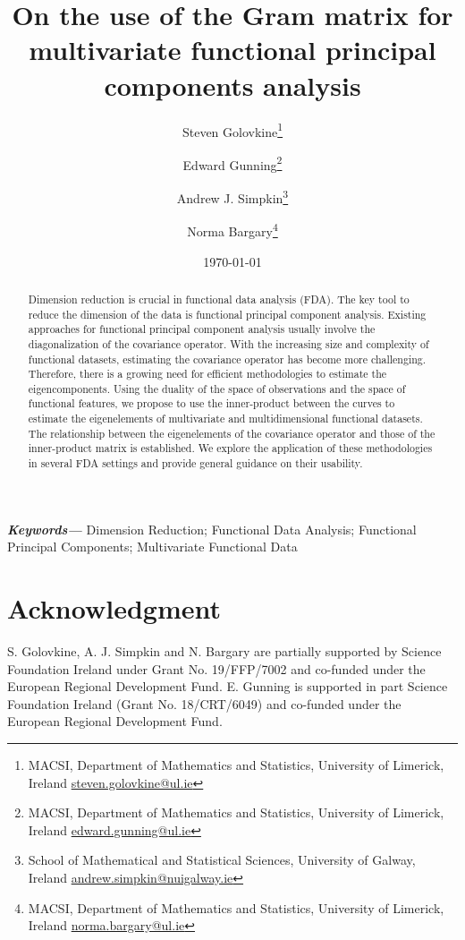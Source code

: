 \documentclass{article}
\title{On the use of the Gram matrix for multivariate functional principal components analysis}
\author{%
Steven Golovkine\thanks{MACSI, Department of Mathematics and Statistics, University of Limerick, Ireland \href{mailto:steven.golovkine@ul.ie}{steven.golovkine@ul.ie}}
\and
Edward Gunning\thanks{MACSI, Department of Mathematics and Statistics, University of Limerick, Ireland \href{mailto:edward.gunning@ul.ie}{edward.gunning@ul.ie}}
\and
Andrew J. Simpkin\thanks{School of Mathematical and Statistical Sciences, University of Galway, Ireland \href{mailto:andrew.simpkin@nuigalway.ie}{andrew.simpkin@nuigalway.ie}}
\and
Norma Bargary\thanks{MACSI, Department of Mathematics and Statistics, University of Limerick, Ireland \href{mailto:norma.bargary@ul.ie}{norma.bargary@ul.ie}}
}
\date{\today}
\newcounter{th}
\providecommand{\keywords}[1]{\textbf{\textit{Keywords---}} #1}
\begin{document}
\maketitle

\begin{abstract}
Dimension reduction is crucial in functional data analysis (FDA). The key tool to reduce the dimension of the data is functional principal component analysis. Existing approaches for functional principal component analysis usually involve the diagonalization of the covariance operator. With the increasing size and complexity of functional datasets, estimating the covariance operator has become more challenging. Therefore, there is a growing need for efficient methodologies to estimate the eigencomponents. Using the duality of the space of observations and the space of functional features, we propose to use the inner-product between the curves to estimate the eigenelements of multivariate and multidimensional functional datasets. The relationship between the eigenelements of the covariance operator and those of the inner-product matrix is established. We explore the application of these methodologies in several FDA settings and provide general guidance on their usability.
\end{abstract}

\keywords{Dimension Reduction; Functional Data Analysis; Functional Principal Components; Multivariate Functional Data}



% 












\appendix






\section*{Acknowledgment}

S. Golovkine, A. J. Simpkin and N. Bargary are partially supported by Science Foundation Ireland under Grant No. 19/FFP/7002 and co-funded under the European Regional Development Fund. E. Gunning is supported in part Science Foundation Ireland (Grant No. 18/CRT/6049) and co-funded under the European Regional Development Fund.



\end{document}
